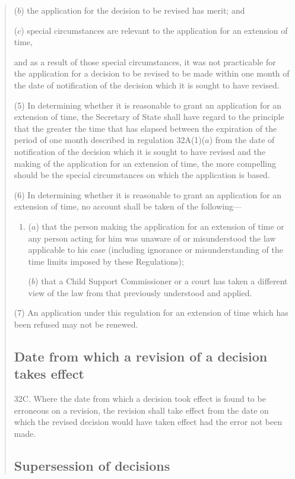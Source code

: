 \documentclass[12pt,a4paper]{article}
\begin{document}
\begin{quotation}
\begin{enumerate}
($b$) the application for the decision to be revised has merit; and

($c$) special circumstances are relevant to the application for an extension of time,
\end{enumerate}
and as a result of those special circumstances, it was not practicable for the application for a decision to be revised to be made within one month of the date of notification of the decision which it is sought to have revised.

(5) In determining whether it is reasonable to grant an application for an extension of time, the Secretary of State shall have regard to the principle that the greater the time that has elapsed between the expiration of the period of one month described in regulation 32A(1)($a$) from the date of notification of the decision which it is sought to have revised and the making of the application for an extension of time, the more compelling should be the special circumstances on which the application is based.

(6) In determining whether it is reasonable to grant an application for an extension of time, no account shall be taken of the following---
\begin{enumerate}\item[]
($a$) that the person making the application for an extension of time or any person acting for him was unaware of or misunderstood the law applicable to his case (including ignorance or misunderstanding of the time limits imposed by these Regulations);

($b$) that a Child Support Commissioner or a court has taken a different view of the law from that previously understood and applied.
\end{enumerate}

(7) An application under this regulation for an extension of time which has been refused may not be renewed.

\subsection*{Date from which a revision of a decision takes effect}

32C.  Where the date from which a decision took effect is found to be erroneous on a revision, the revision shall take effect from the date on which the revised decision would have taken effect had the error not been made.

\subsection*{Supersession of decisions}


\end{quotation}
\end{document}
